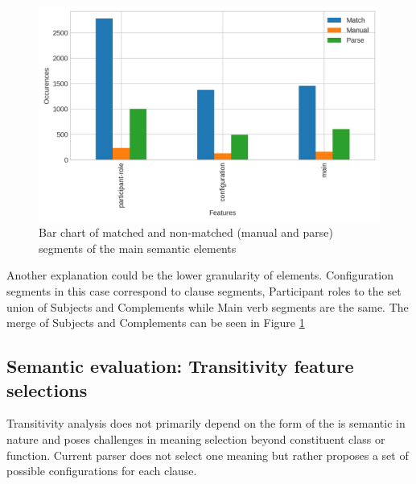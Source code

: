 \begin{figure}[!ht]
    \centering
    \includegraphics[width=.95\textwidth]{evaluation-results/figures/accuracy-semantic-figure-elements}
    \caption{Bar chart of matched and non-matched (manual and parse) segments of the main semantic elements}
    \label{fig:configuration-elements}
\end{figure}

Another explanation could be the lower granularity of elements. Configuration segments in this case correspond to clause segments, Participant roles to the set union of Subjects and Complements while Main verb segments are the same. The merge of Subjects and Complements can be seen in Figure \ref{fig:configuration-elements}

\subsection{Semantic evaluation: Transitivity feature selections}
Transitivity analysis does not primarily depend on the form of the  is semantic in nature and poses challenges in meaning selection beyond constituent class or function. Current parser does not select one meaning but rather proposes a set of possible configurations for each clause.

%

